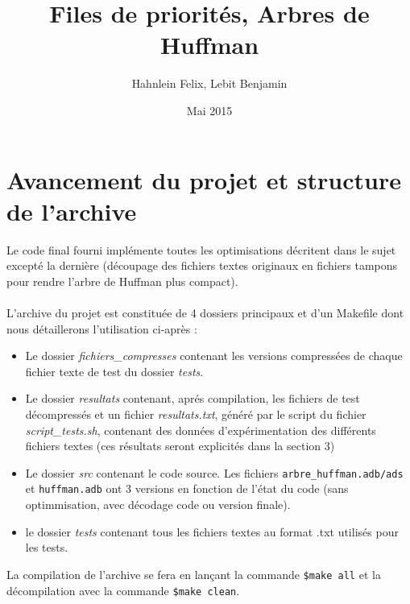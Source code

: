 \documentclass[a4paper,11pt]{article}
\title{Files de priorités, Arbres de Huffman}
\author{Hahnlein Felix, Lebit Benjamin}
\date{Mai 2015}
\begin{document}
\maketitle

\section{Avancement du projet et structure de l'archive}
Le code final fourni implémente toutes les optimisations décritent dans le sujet excepté la dernière (découpage des fichiers textes originaux en fichiers tampons pour rendre l'arbre de Huffman plus compact). \\\\
L'archive du projet est constituée de 4 dossiers principaux et d'un Makefile dont nous détaillerons l'utilisation ci-après :
\begin{itemize}
\item Le dossier \textit{fichiers\_compresses} contenant les versions compressées de chaque fichier texte de test du dossier \textit{tests}.
\item Le dossier \textit{resultats} contenant, aprés compilation, les fichiers de test décompressés et un fichier \textit{resultats.txt}, généré par le script du fichier\textit{ script\_tests.sh}, contenant des données d'expérimentation des différents fichiers textes (ces résultats seront explicités dans la section 3)
\item Le dossier \textit{src} contenant le code source. Les fichiers \verb+arbre_huffman.adb/ads+ et \verb+huffman.adb+ ont 3 versions en fonction de l'état du code (sans optimmisation, avec décodage code ou version finale).
\item le dossier \textit{tests} contenant tous les fichiers textes au format .txt utilisés pour les tests.
\end{itemize}
La compilation de l'archive se fera en lançant la commande \verb+$make all+ et la décompilation avec la commande \verb+$make clean+. \\
\end{document}
